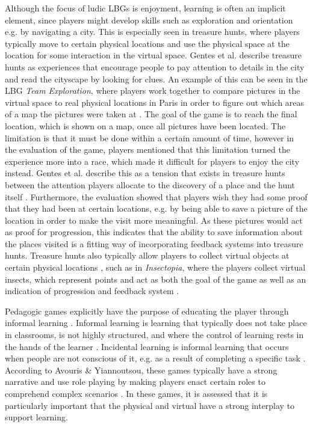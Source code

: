 Although the focus of ludic LBGs is enjoyment, learning is often an implicit element, since players might develop skills such as exploration and orientation e.g. by navigating a city. This is especially seen in treasure hunts, where players typically move to certain physical locations and use the physical space at the location for some interaction in the virtual space. Gentes et al. describe treasure hunts as experiences that encourage people to pay attention to details in the city and read the cityscape by looking for clues. An example of this can be seen in the LBG \textit{Team Exploration}, where players work together to compare pictures in the virtual space to real physical locations in Paris in order to figure out which areas of a map the pictures were taken at \cite{GamingOnTheMove}. The goal of the game is to reach the final location, which is shown on a map, once all pictures have been located. The limitation is that it must be done within a certain amount of time, however in the evaluation of the game, players mentioned that this limitation turned the experience more into a race, which made it difficult for players to enjoy the city instead. Gentes et al. describe this as a tension that exists in treasure hunts between the attention players allocate to the discovery of a place and the hunt itself \cite{GamingOnTheMove}. Furthermore, the evaluation showed that players wish they had some proof that they had been at certain locations, e.g. by being able to save a picture of the location in order to make the visit more meaningful. As these pictures would act as proof for progression, this indicates that the ability to save information about the places visited is a fitting way of incorporating feedback systems into treasure hunts. Treasure hunts also typically allow players to collect virtual objects at certain physical locations \cite{LBG_Review}, such as in \textit{Insectopia}, where the players collect virtual insects, which represent points and act as both the goal of the game as well as an indication of progression and feedback system \cite{Insectopia}.

Pedagogic games explicitly have the purpose of educating the player through informal learning \cite{LBG_Review}. Informal learning is learning that typically does not take place in classrooms, is not highly structured, and where the control of learning rests in the hands of the learner \cite{informallearning}. Incidental learning is informal learning that occurs when people are not conscious of it, e.g. as a result of completing a specific task \cite{informallearning}. According to Avouris \& Yiannoutsou, these games typically have a strong narrative and use role playing by making players enact certain roles to comprehend complex scenarios \cite{LBG_Review}. In these games, it is assessed that it is particularly important that the physical and virtual have a strong interplay to support learning.


